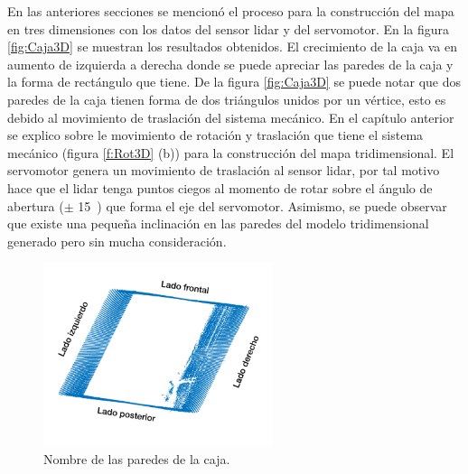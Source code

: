 En las anteriores secciones se mencionó el proceso para la construcción del mapa en 
tres dimensiones con los datos del sensor lidar y del servomotor. En la figura 
\ref{fig:Caja3D} se muestran los resultados obtenidos. El crecimiento de la caja va en
aumento de izquierda a derecha donde se puede apreciar las paredes de la caja y la forma
de rectángulo que tiene. De la figura \ref{fig:Caja3D} se puede notar que dos paredes de 
la caja tienen forma de dos triángulos unidos por un vértice, esto es debido al movimiento 
de traslación del sistema mecánico. En el capítulo anterior se explico sobre le movimiento 
de rotación y traslación que tiene el sistema mecánico (figura \ref{f:Rot3D} (b)) para la 
construcción del mapa tridimensional. El servomotor genera un movimiento de traslación al 
sensor lidar, por tal motivo hace que el lidar tenga puntos ciegos al momento de rotar 
sobre el ángulo de abertura ($\pm$ 15\grad~) que forma el eje del servomotor. Asimismo,
se puede observar que existe una pequeña inclinación en las paredes del modelo 
tridimensional generado pero sin mucha consideración.

\begin{figure}
  \centering \footnotesize
  \includegraphics[width=0.60\textwidth]{images/lados_caja.png}
  \captionsetup{font=footnotesize}
  \caption{Nombre de las paredes de la caja.}
  \label{fig:paredCaja}
\end{figure}

